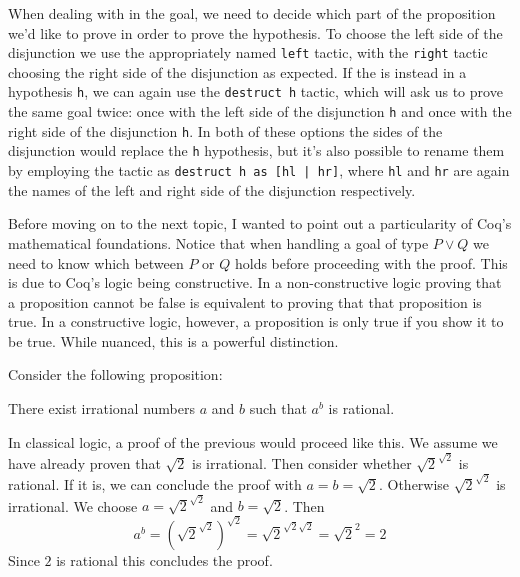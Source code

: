 When dealing with \texttt{\/} in the goal, we need to decide which part of the proposition we'd
like to prove in order to prove the hypothesis. To choose the left side of the disjunction we use the
appropriately named \texttt{left} tactic, with the \texttt{right} tactic choosing the
right side of the disjunction as expected. If the \texttt{\/} is instead in a hypothesis 
\texttt{h}, we can again use the \texttt{destruct h} tactic, which will ask us to
prove the same goal twice: once with the left side of the disjunction \texttt{h} and once with
the right side of the disjunction \texttt{h}. In both of these options the sides of the 
disjunction would replace the \texttt{h} hypothesis, but it's also possible to rename them 
by employing the tactic as \texttt{destruct h as [hl | hr]}, where \texttt{hl} and
\texttt{hr} are again the names of the left and right side of the disjunction respectively.

Before moving on to the next topic, I wanted to point out a particularity of Coq's mathematical
foundations. Notice that when handling a goal of type $P \vee Q$ we need to know which between $P$ or $Q$
holds before proceeding with the proof. This is due to Coq's logic being constructive. In a 
non-constructive logic proving that a proposition cannot be false is equivalent to proving that that
proposition is true. In a constructive logic, however, a proposition is only true if you show it to be
true. While nuanced, this is a powerful distinction.

Consider the following proposition:
\begin{center}
There exist irrational numbers $a$ and $b$ such that $a^b$ is rational.
\end{center}
In classical logic, a proof of the previous would proceed like this. We assume we have already proven that
$\sqrt{2}$ is irrational. Then consider whether $\sqrt{2}^{\sqrt{2}}$ is rational. If it is, we can conclude
the proof with $a = b = \sqrt{2}$. Otherwise $\sqrt{2}^{\sqrt{2}}$ is irrational. We choose $a = \sqrt{2}^
{\sqrt{2}}$ and $b = \sqrt{2}$. Then
$$
a^b = \left(\sqrt{2}^{\sqrt{2}}\right)^{\sqrt{2}} = \sqrt{2}^{\sqrt{2}\sqrt{2}} = \sqrt{2} ^ 2 = 2
$$
\noindent Since $2$ is rational this concludes the proof.

